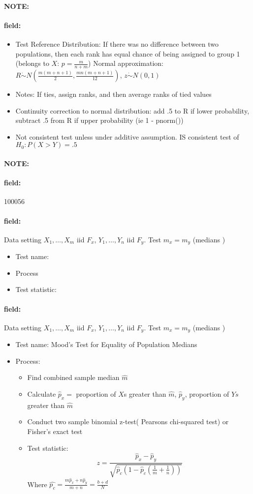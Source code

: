 \documentclass[12pt]{article}
\newenvironment{note}{\paragraph{NOTE:}}{}
\newenvironment{field}{\paragraph{field:}}{}
\begin{document}
\begin{note}
\begin{field}
\begin{itemize}
   \item Test Reference Distribution: If there was no difference between two populations, then each rank has equal chance of being assigned to group 1 (belongs to $X$: $p = \frac{m}{n+m}$)
         Normal approximation: $R \dot\sim N( \frac{m(m+n+1)}{2}, \frac{mn(m+n+1)}{12})$, $z \dot\sim N(0,1)$
   \item Notes: If ties, assign ranks, and then average ranks of tied values
   \item Continuity correction to normal distribution: add .5 to R if lower probability, subtract .5 from R if upper probability (ie 1 - pnorm())
   \item Not consistent test unless under additive assumption. IS consistent test of $H_0: P(X > Y) = .5$
  \end{itemize}
 \end{field}
\end{note}

\begin{note} \begin{field} \tiny 100056 \end{field}
 \begin{field}
  Data setting $X_1, \ldots , X_m$ iid $F_x$, $Y_1, \ldots, Y_n$ iid $F_y$. Test $m_x = m_y$ (medians )
  \begin{itemize}
   \item Test name:
   \item Process
   \item Test statistic:
  \end{itemize}
 \end{field}
 \begin{field}
  Data setting $X_1, \ldots , X_m$ iid $F_x$, $Y_1, \ldots, Y_n$ iid $F_y$. Test $m_x = m_y$ (medians )
  \begin{itemize}
   \item Test name: Mood's Test for Equality of Population Medians
   \item Process:
         \begin{itemize}
          \item Find combined sample median $\hat{m}$
          \item Calculate $\hat{p}_x = $ proportion of $X$s greater than $\hat{m}$, $\hat{p}_y$, proportion of $Ys$ greater than $\hat{m}$
          \item Conduct two sample binomial z-test( Pearsons chi-squared test) or Fisher's exact test
          \item  Test statistic: $$ z = \frac{\hat{p}_x - \hat{p}_y}{\sqrt{\hat{p}_c(1 - \hat{p}_c(\frac{1}{m} + \frac{1}{n}))}} $$ Where $\hat{p_c} = \frac{m\hat{p}_x + n\hat{p}_y}{m+n} = \frac{b + d}{N}$
         \end{itemize}
  \end{itemize}
 \end{field}
\end{note}
\end{document}
